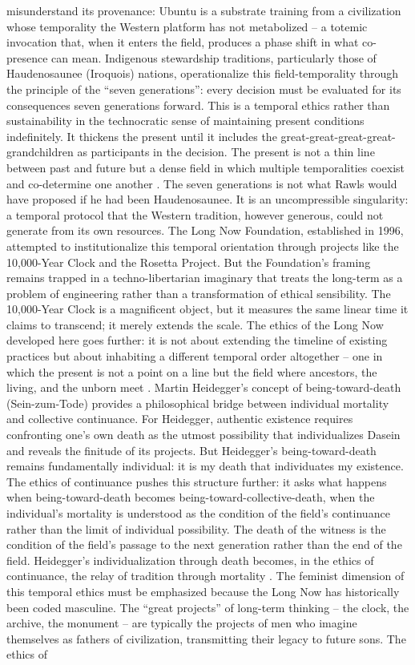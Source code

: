 misunderstand its provenance: Ubuntu is a substrate training from a civilization whose temporality the Western platform has not metabolized – a totemic invocation that, when it enters the field, produces a phase shift in what co-presence can mean. Indigenous stewardship traditions, particularly those of Haudenosaunee (Iroquois) nations, operationalize this field-temporality through the principle of the “seven generations”: every decision must be evaluated for its consequences seven generations forward. This is a temporal ethics rather than sustainability in the technocratic sense of maintaining present conditions indefinitely. It thickens the present until it includes the great-great-great-great-grandchildren as participants in the decision. The present is not a thin line between past and future but a dense field in which multiple temporalities coexist and co-determine one another \cite[pp.~6-10, 207-228]{kimmerer_2013}. The seven generations is not what Rawls would have proposed if he had been Haudenosaunee. It is an uncompressible singularity: a temporal protocol that the Western tradition, however generous, could not generate from its own resources. The Long Now Foundation, established in 1996, attempted to institutionalize this temporal orientation through projects like the 10,000-Year Clock and the Rosetta Project. But the Foundation’s framing remains trapped in a techno-libertarian imaginary that treats the long-term as a problem of engineering rather than a transformation of ethical sensibility. The 10,000-Year Clock is a magnificent object, but it measures the same linear time it claims to transcend; it merely extends the scale. The ethics of the Long Now developed here goes further: it is not about extending the timeline of existing practices but about inhabiting a different temporal order altogether – one in which the present is not a point on a line but the field where ancestors, the living, and the unborn meet \cite{brand_1999}. Martin Heidegger’s concept of being-toward-death (Sein-zum-Tode) provides a philosophical bridge between individual mortality and collective continuance. For Heidegger, authentic existence requires confronting one’s own death as the utmost possibility that individualizes Dasein and reveals the finitude of its projects. But Heidegger’s being-toward-death remains fundamentally individual: it is my death that individuates my existence. The ethics of continuance pushes this structure further: it asks what happens when being-toward-death becomes being-toward-collective-death, when the individual’s mortality is understood as the condition of the field’s continuance rather than the limit of individual possibility. The death of the witness is the condition of the field’s passage to the next generation rather than the end of the field. Heidegger’s individualization through death becomes, in the ethics of continuance, the relay of tradition through mortality \cite[pp.~279-311]{heidegger_1927}. The feminist dimension of this temporal ethics must be emphasized because the Long Now has historically been coded masculine. The “great projects” of long-term thinking – the clock, the archive, the monument – are typically the projects of men who imagine themselves as fathers of civilization, transmitting their legacy to future sons. The ethics of 